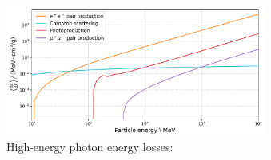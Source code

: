\begin{frame}{}
\begin{minipage}[t][1cm][t]{\textwidth}
\begin{columns}[t]
\begin{figure}
    \end{figure}
    \vspace{-15pt}
    \begin{figure}
      \caption*{High-energy photon energy losses:}
      \vspace{-9pt}
      \includegraphics[width=\linewidth, height=.37\textheight, keepaspectratio]{plots/photon_dEdx.png}
    \end{figure}
  \end{columns}

  \end{minipage}
\end{frame}


